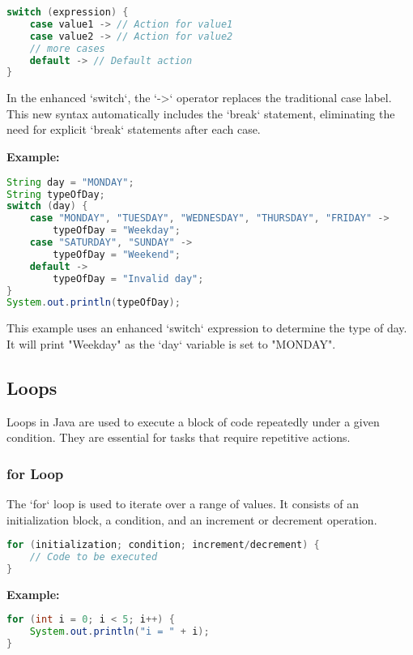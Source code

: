 \documentclass{article}
\begin{document}
\begin{lstlisting}[language=Java]
switch (expression) {
    case value1 -> // Action for value1
    case value2 -> // Action for value2
    // more cases
    default -> // Default action
}
\end{lstlisting}

In the enhanced `switch`, the `->` operator replaces the traditional case label. This new syntax automatically includes the `break` statement, eliminating the need for explicit `break` statements after each case.

\newpage
\textbf{Example:}

\begin{lstlisting}[language=Java]
String day = "MONDAY";
String typeOfDay;
switch (day) {
    case "MONDAY", "TUESDAY", "WEDNESDAY", "THURSDAY", "FRIDAY" ->
        typeOfDay = "Weekday";
    case "SATURDAY", "SUNDAY" ->
        typeOfDay = "Weekend";
    default ->
        typeOfDay = "Invalid day";
}
System.out.println(typeOfDay);
\end{lstlisting}

This example uses an enhanced `switch` expression to determine the type of day. It will print "Weekday" as the `day` variable is set to "MONDAY".



\subsection{Loops}
Loops in Java are used to execute a block of code repeatedly under a given condition. They are essential for tasks that require repetitive actions.

\subsubsection{for Loop}
The `for` loop is used to iterate over a range of values. It consists of an initialization block, a condition, and an increment or decrement operation.

\begin{lstlisting}[language=Java]
for (initialization; condition; increment/decrement) {
    // Code to be executed
}
\end{lstlisting}

\textbf{Example:}

\begin{lstlisting}[language=Java]
for (int i = 0; i < 5; i++) {
    System.out.println("i = " + i);
}
\end{lstlisting}
\end{document}
